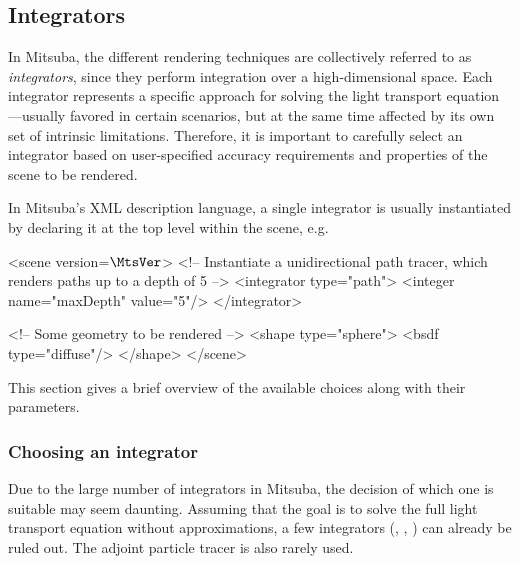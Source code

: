 \newpage
\subsection{Integrators}
\label{sec:integrators}
In Mitsuba, the different rendering techniques are collectively referred to as
\emph{integrators}, since they perform integration over a high-dimensional
space. Each integrator represents a specific approach for solving
the light transport equation---usually favored in certain scenarios, but
at the same time affected by its own set of intrinsic limitations.
Therefore, it is important to carefully select an integrator based on
user-specified accuracy requirements and properties of the scene to be
rendered.

In Mitsuba's XML description language, a single integrator
is usually instantiated by declaring it at the top level within the
scene, e.g.
\begin{xml}
<scene version=$\MtsVer$>
    <!-- Instantiate a unidirectional path tracer,
         which renders paths up to a depth of 5 -->
    <integrator type="path">
        <integer name="maxDepth" value="5"/>
    </integrator>

    <!-- Some geometry to be rendered -->
    <shape type="sphere">
        <bsdf type="diffuse"/>
    </shape>
</scene>
\end{xml}

This section gives a brief overview of the available choices
along with their parameters.

\subsubsection*{Choosing an integrator}
Due to the large number of integrators in Mitsuba, the decision of which
one is suitable may seem daunting. Assuming that the goal is to solve
the full light transport equation without approximations, a few integrators
(, , )
can already be ruled out. The adjoint particle tracer  is
also rarely used.

